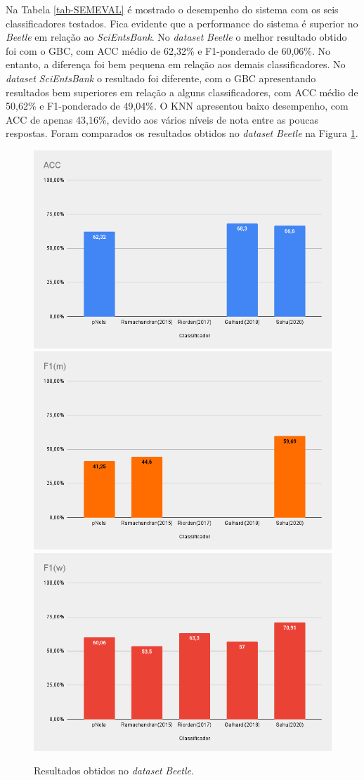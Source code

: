 Na Tabela \ref{tab-SEMEVAL} é mostrado o desempenho do sistema com os seis classificadores testados. Fica evidente que a performance do sistema é superior no \textit{Beetle} em relação ao \textit{SciEntsBank}. No \textit{dataset} \textit{Beetle} o melhor resultado obtido foi com o GBC, com ACC médio de 62,32\% e F1-ponderado de 60,06\%. No entanto, a diferença foi bem pequena em relação aos demais classificadores. No \textit{dataset} \textit{SciEntsBank} o resultado foi diferente, com o GBC apresentando resultados bem superiores em relação a alguns classificadores, com ACC médio de 50,62\% e F1-ponderado de 49,04\%. O KNN apresentou baixo desempenho, com ACC de apenas 43,16\%, devido aos vários níveis de nota entre as poucas respostas. Foram comparados os resultados obtidos no \textit{dataset} \textit{Beetle} na Figura \ref{fig-semeval-beetle}.

\begin{figure}[!h]
\centering
\includegraphics[width=.6\textwidth]{figuras/beetle/res-beetle-acc.png}
\includegraphics[width=.6\textwidth]{figuras/beetle/res-beetle-mfs.png}
\includegraphics[width=.6\textwidth]{figuras/beetle/res-beetle-wfs.png}
\caption{Resultados obtidos no \textit{dataset} \textit{Beetle}.}
\label{fig-semeval-beetle}
\end{figure}


